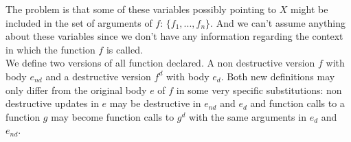 \documentclass[12pt,a4paper]{article}
\begin{document}
The problem is that some of these variables possibly pointing to $X$ might be included in the set of arguments of $f$: $\{f_1, ... , f_n\}$. And we can't assume anything about these variables since we don't have any information regarding the context in which the function $f$ is called.\\

We define two versions of all function declared. A non destructive version $f$ with body $e_{nd}$ and a destructive version $f^d$ with body $e_d$.
Both new definitions may only differ from the original body $e$ of $f$ in some very specific substitutions: non destructive updates in $e$ may be destructive in $e_{nd}$ and $e_d$ and function calls to a function $g$ may become function calls to $g^d$ with the same arguments in $e_d$ and $e_{nd}$.\\
\end{document}
